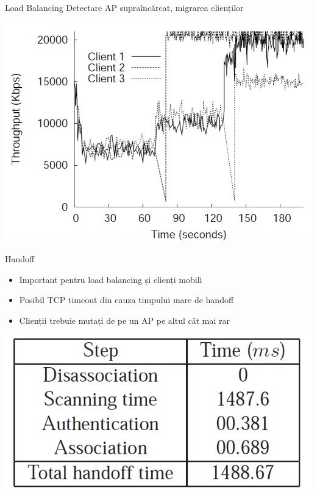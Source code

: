 \begin{frame}{Load Balancing}
  Detectare AP supraîncărcat, migrarea clienților
  \begin{center}
    \includegraphics[scale=0.35]{img/fig18.png}
  \end{center}
\end{frame}

\begin{frame}{Handoff}
  \begin{itemize}
    \item Important pentru load balancing și clienți mobili
    \item Posibil TCP timeout din cauza timpului mare de handoff
    \item Clienții trebuie mutați de pe un AP pe altul cât mai rar
  \end{itemize}
  \begin{center}
    \includegraphics[scale=0.2]{img/table2.png}
  \end{center}
\end{frame}

